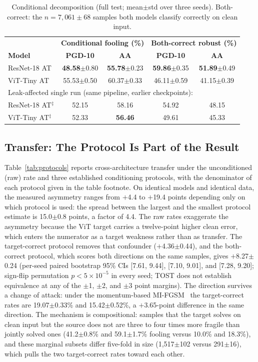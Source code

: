 \documentclass[conference]{IEEEtran}
\begin{document}
\begin{table}[!t]
\centering
\caption{Conditional decomposition (full test; mean$\pm$std over three seeds). Both-correct: the $n=7{,}061\pm68$ samples both models classify correctly on clean input.}
\label{tab:cond}
\scriptsize
\setlength{\tabcolsep}{2.5pt}
\begin{tabular}{lcccc}
\toprule
& \multicolumn{2}{c}{\textbf{Conditional fooling (\%)}} & \multicolumn{2}{c}{\textbf{Both-correct robust (\%)}} \\
\textbf{Model} & \textbf{PGD-10} & \textbf{AA} & \textbf{PGD-10} & \textbf{AA} \\
\midrule
ResNet-18 AT & \textbf{48.58}$\pm$0.80 & \textbf{55.78}$\pm$0.23 & \textbf{59.86}$\pm$0.35 & \textbf{51.89}$\pm$0.49 \\
ViT-Tiny AT & 55.53$\pm$0.50 & 60.37$\pm$0.33 & 46.11$\pm$0.59 & 41.15$\pm$0.39 \\
\midrule
\multicolumn{5}{l}{\scriptsize Leak-affected single run (same pipeline, earlier checkpoints):}\\
ResNet-18 AT$^{\ddagger}$ & 52.15 & 58.16 & 54.92 & 48.15 \\
ViT-Tiny AT$^{\ddagger}$ & 52.33 & \textbf{56.46} & 49.61 & 45.33 \\
\bottomrule
\end{tabular}
\end{table}

\subsection{Transfer: The Protocol Is Part of the Result}
Table~\ref{tab:protocols} reports cross-architecture transfer under the unconditioned (raw) rate and three established conditioning protocols, with the denominator of each protocol given in the table footnote. On identical models and identical data, the measured asymmetry ranges from $+$4.4 to $+$19.4 points depending only on which protocol is used: the spread between the largest and the smallest protocol estimate is 15.0$\pm$0.8 points, a factor of 4.4. The raw rates exaggerate the asymmetry because the ViT target carries a twelve-point higher clean error, which enters the numerator as a target weakness rather than as transfer. The target-correct protocol removes that confounder ($+$4.36$\pm$0.44), and the both-correct protocol, which scores both directions on the same samples, gives $+$8.27$\pm$0.24 (per-seed paired bootstrap 95\% CIs [7.61, 9.44], [7.10, 9.01], and [7.28, 9.20]; sign-flip permutation $p<5\times10^{-5}$ in every seed; TOST does not establish equivalence at any of the $\pm$1, $\pm$2, and $\pm$3 point margins). The direction survives a change of attack: under the momentum-based MI-FGSM~\cite{dong2018boosting} the target-correct rates are 19.07$\pm$0.33\% and 15.42$\pm$0.52\%, a $+$3.65-point difference in the same direction. The mechanism is compositional: samples that the target solves on clean input but the source does not are three to four times more fragile than jointly solved ones (41.2$\pm$0.8\% and 59.1$\pm$1.7\% fooling versus 10.0\% and 18.3\%), and these marginal subsets differ five-fold in size (1{,}517$\pm$102 versus 291$\pm$16), which pulls the two target-correct rates toward each other.
\end{document}
